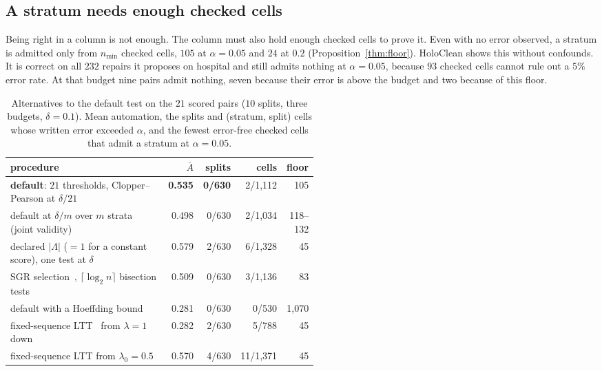 \documentclass[sigconf, nonacm, balance=false]{acmart}
\theoremstyle{remark}
\begin{document}
\subsection{A stratum needs enough checked cells}
\label{sec:zero}

Being right in a column is not enough. The column must also hold enough checked cells
to prove it. Even with no error observed, a stratum is admitted only from $n_{\min}$
checked cells, $105$ at $\alpha=0.05$ and $24$ at $0.2$
(Proposition~\ref{thm:floor}). HoloClean shows this without confounds. It is correct on
all $232$ repairs it proposes on hospital and still admits nothing at $\alpha=0.05$,
because $93$ checked cells cannot rule out a $5\%$ error rate. At that budget nine
pairs admit nothing, seven because their error is above the budget and two because of
this floor.

\begin{table}[t]
  \centering
  \caption{Alternatives to the default test on the $21$ scored pairs ($10$ splits,
  three budgets, $\delta=0.1$). Mean automation, the splits and (stratum, split) cells
  whose written error exceeded $\alpha$, and the fewest error-free checked cells that
  admit a stratum at $\alpha=0.05$.}
  \label{tab:proc}
  \small
  \setlength{\tabcolsep}{3pt}
  \begin{tabular}{@{}>{\raggedright\arraybackslash}p{0.52\linewidth}rrrr@{}}
  \toprule
  procedure & $\bar A$ & splits & cells & floor \\
  \midrule
  \textbf{default}: $21$ thresholds, Clopper--Pearson at $\delta/21$ & \textbf{0.535} & \textbf{0/630} & 2/1{,}112 & 105 \\
  default at $\delta/m$ over $m$ strata (joint validity) & 0.498 & 0/630 & 2/1{,}034 & 118--132 \\
  declared $|\Lambda|$ ($=1$ for a constant score), one test at $\delta$ & 0.579 & 2/630 & 6/1{,}328 & 45 \\
  SGR selection~\cite{geifman2017selective}, $\lceil\log_2 n\rceil$ bisection tests & 0.509 & 0/630 & 3/1{,}136 & 83 \\
  default with a Hoeffding bound & 0.281 & 0/630 & 0/530 & 1{,}070 \\
  fixed-sequence LTT~\cite{10.1214/24-AOAS1998} from $\lambda=1$ down & 0.282 & 2/630 & 5/788 & 45 \\
  fixed-sequence LTT from $\lambda_0=0.5$ & 0.570 & 4/630 & 11/1{,}371 & 45 \\
  \bottomrule
  \end{tabular}
\end{table}
\end{document}
